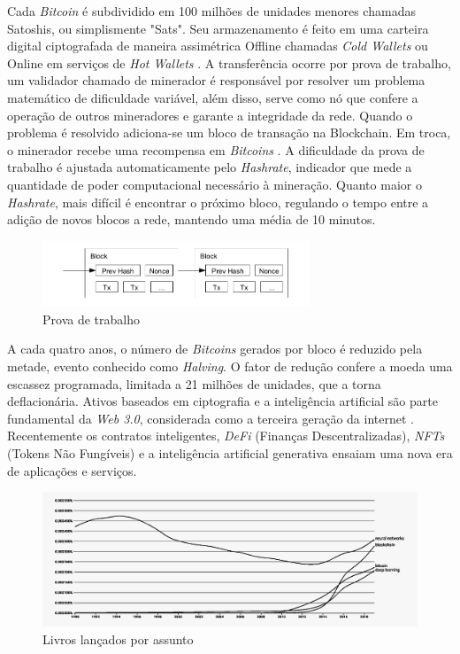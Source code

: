 Cada \textit{Bitcoin} é subdividido em 100 milhões de unidades menores chamadas Satoshis, ou simplismente "Sats".
Seu armazenamento é feito em uma carteira digital ciptografada de maneira assimétrica Offline chamadas \textit{Cold Wallets} ou Online em serviços de \textit{Hot Wallets} \cite{wallet}.
A transferência ocorre por prova de trabalho, um validador chamado de minerador é responsável por resolver um problema matemático de dificuldade variável, além disso, serve como nó que confere a operação de outros mineradores e garante a integridade da rede.
Quando o problema é resolvido adiciona-se um bloco de transação na Blockchain. Em troca, o minerador recebe uma recompensa em \textit{Bitcoins} \cite{pow}.
A dificuldade da prova de trabalho é ajustada automaticamente pelo \textit{Hashrate}, indicador que mede a quantidade de poder computacional necessário à mineração. Quanto maior o \textit{Hashrate}, mais difícil é encontrar o próximo bloco, regulando o tempo entre a adição de novos blocos a rede, mantendo uma média de 10 minutos.

\begin{figure}[!htb] \centering
    \caption{Prova de trabalho} \label{figura:imageNonce}
    \begin{varwidth}{\linewidth}
      \includegraphics[width=8cm]{figuras/nonce.png}
    \end{varwidth}
  \end{figure}

A cada quatro anos, o número de \textit{Bitcoins} gerados por bloco é reduzido pela metade, evento conhecido como \textit{Halving}.
O fator de redução confere a moeda uma escassez programada, limitada a 21 milhões de unidades, que a torna deflacionária.
Ativos baseados em ciptografia e a inteligência artificial são parte fundamental da \textit{Web 3.0}, considerada como a terceira geração da internet \cite{web3}.
Recentemente os contratos inteligentes, \textit{DeFi} (Finanças Descentralizadas), \textit{NFTs} (Tokens Não Fungíveis) e a inteligência artificial generativa ensaiam uma nova era de aplicações e serviços.

\begin{figure}[!htb] \centering
    \caption{Livros lançados por assunto} \label{figura:imagengram}
    \begin{varwidth}{\linewidth}
      \includegraphics[width=15cm]{figuras/ngram.png}
    \end{varwidth}
  \end{figure}

